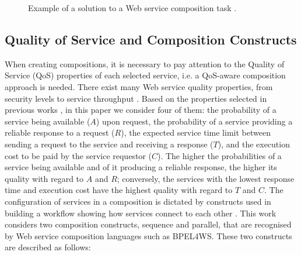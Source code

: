 \documentclass{llncs}
\begin{document}
\begin{figure}[h]
\centerline{
}
\caption{Example of a solution to a Web service composition task \protect\cite{da2015graphevol}.}
\label{compositionExample}
\end{figure}

\subsection{Quality of Service and Composition Constructs}\label{qos_and_constructs}

When creating compositions, it is necessary to pay attention to the Quality of Service (QoS) properties of each selected service, i.e. a QoS-aware composition approach is needed. There exist many Web service quality properties, from security levels to service throughput \cite{menasce2002qos}. Based on the properties selected in previous works \cite{jaeger2007qos,yu2013adaptive}, in this paper we consider four of them: the probability of a service being available ($A$) upon request, the probability of a service providing a reliable response to a request ($R$), the expected service time limit between sending a request to the service and receiving a response ($T$), and the execution cost to be paid by the service requestor ($C$). The higher the probabilities of a service being available and of it producing a reliable response, the higher its quality with regard to $A$ and $R$; conversely, the services with the lowest response time and execution cost have the highest quality with regard to $T$ and $C$. The configuration of services in a composition is dictated by constructs used in building a workflow showing how services connect to each other \cite{zeng2003quality}. This work considers two composition constructs, sequence and parallel, that are recognised by Web service composition languages such as BPEL4WS\cite{yu2013adaptive,cardoso2004quality}. These two constructs are described as follows:
\end{document}
